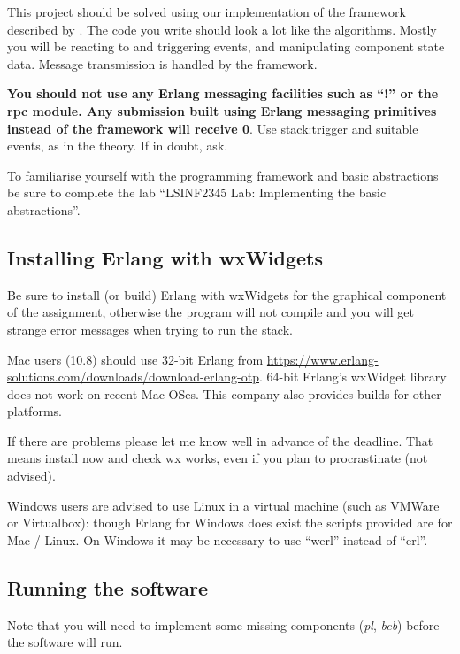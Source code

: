 \documentclass[a4paper]{article}
\begin{document}
This project should be solved using our implementation of the framework
described by \cite{cachin2011}. The code you write should look a lot like the
algorithms. Mostly you will be reacting to and triggering events, and
manipulating component state data. Message transmission is handled by the
framework.

\textbf{You should not use any Erlang messaging facilities such as ``!'' or the rpc
module. Any submission built using Erlang messaging primitives
instead of the framework will receive 0}. Use stack:trigger
and suitable events, as in the theory. If in doubt, ask.

To familiarise yourself with the programming framework and basic abstractions
be sure to complete the lab ``LSINF2345 Lab: Implementing the basic
abstractions''.


\subsection*{Installing Erlang with wxWidgets} %
\label{sub:installing_erlang_and_wx}

Be sure to install (or build) Erlang with wxWidgets for the graphical
component of the assignment, otherwise the program will not compile and you
will get strange error messages when trying to run the stack.

Mac users (10.8) should use 32-bit Erlang from
\url{https://www.erlang-solutions.com/downloads/download-erlang-otp}. 64-bit
Erlang's wxWidget library does not work on recent Mac OSes. This
company also provides builds for other platforms.

If there are problems please let me know well in advance of the deadline.
That means install now and check wx works, even if you plan to procrastinate
(not advised).

Windows users are advised to use Linux in a virtual machine (such as VMWare or
Virtualbox): though Erlang for Windows does exist the scripts provided are for
Mac / Linux. On Windows it may be necessary to use ``werl'' instead of ``erl''.




\subsection*{Running the software} %
\label{sub:running_the_software}

Note that you will need to implement some missing components (\emph{pl},
\emph{beb}) before the software will run.
\end{document}
